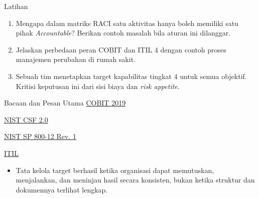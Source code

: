 \documentclass[aspectratio=169, table, 12pt]{beamer}
\begin{document}
\begin{frame}{{\Large Latihan}}
  \vspace{6pt}
  \small
  \begin{enumerate}
    \item Mengapa dalam matriks RACI satu aktivitas hanya boleh memiliki satu pihak
          \textit{Accountable}? Berikan contoh masalah bila aturan ini dilanggar.
    \item Jelaskan perbedaan peran COBIT dan ITIL 4 dengan contoh proses manajemen perubahan di
          rumah sakit.
    \item Sebuah tim menetapkan target kapabilitas tingkat 4 untuk semua objektif. Kritisi keputusan
          ini dari sisi biaya dan \textit{risk appetite}.
  \end{enumerate}
\end{frame}

\begin{frame}{{\Large Bacaan dan Pesan Utama}}
  \vspace{6pt}
  \small
  \href{https://www.isaca.org/resources/cobit}{COBIT 2019}\par
  \href{https://doi.org/10.6028/NIST.CSWP.29}{NIST CSF 2.0}\par
  \href{https://doi.org/10.6028/NIST.SP.800-12r1}{NIST SP 800-12 Rev. 1}\par
  \href{https://www.peoplecert.org/Frameworks-Professionals/ITIL-framework}{ITIL}\par
  \vspace{8pt}
  \begin{itemize}
    \item Tata kelola target berhasil ketika organisasi dapat memutuskan, menjalankan, dan meninjau
          hasil secara konsisten, bukan ketika struktur dan dokumennya terlihat lengkap.
  \end{itemize}
\end{frame}
\end{document}
